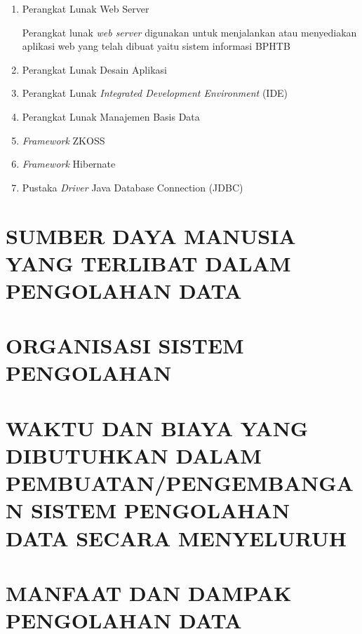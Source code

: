 \documentclass[pdftex,12pt, oneside]{article}
\begin{document}
\begin{enumerate}[1.]
  \item Perangkat Lunak Web Server
  
Perangkat lunak \textit{web server} digunakan untuk menjalankan atau menyediakan aplikasi web yang telah dibuat yaitu sistem informasi BPHTB
  
  \item Perangkat Lunak Desain Aplikasi
  
  \item Perangkat Lunak \textit{Integrated Development Environment} (IDE)
  
  \item Perangkat Lunak Manajemen Basis Data
  
  \item \textit{Framework} ZKOSS
  
  \item \textit{Framework} Hibernate
  
  \item Pustaka \textit{Driver} Java Database Connection (JDBC)
\end{enumerate}

\section{SUMBER DAYA MANUSIA YANG TERLIBAT DALAM PENGOLAHAN DATA}


\section{ORGANISASI SISTEM PENGOLAHAN}


\section{WAKTU DAN BIAYA YANG DIBUTUHKAN DALAM PEMBUATAN/PENGEMBANGAN SISTEM PENGOLAHAN DATA SECARA MENYELURUH}


\section{MANFAAT DAN DAMPAK PENGOLAHAN DATA}
\end{document}
